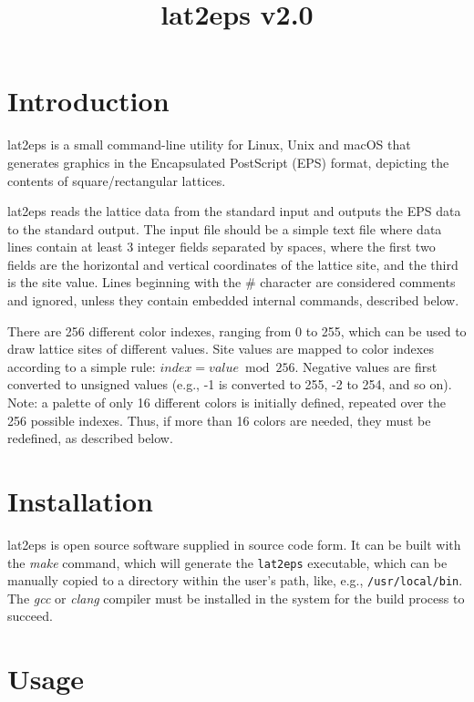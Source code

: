 \documentclass[a4paper]{article}
\title{\vspace{-5ex}lat2eps v2.0}
\author{}
\date{\vspace{-5ex}}
\begin{document}
\maketitle


\section{Introduction}

lat2eps is a small command-line utility for Linux, Unix and macOS that generates graphics in the Encapsulated PostScript (EPS) format, depicting the contents of square/rectangular lattices.
\bigbreak

lat2eps reads the lattice data from the standard input and outputs the EPS data to the standard output. The input file should be a simple text file where data lines contain at least 3 integer fields separated by spaces, where the first two fields are the horizontal and vertical coordinates of the lattice site, and the third is the site value. Lines beginning with the \# character are considered comments and ignored, unless they contain embedded internal commands, described below.
\bigbreak

There are 256 different color indexes, ranging from 0 to 255, which can be used to draw lattice sites of different values. Site values are mapped to color indexes according to a simple rule: $index = value \bmod 256$. Negative values are first converted to unsigned values (e.g., -1 is converted to 255, -2 to 254, and so on). Note: a palette of only 16 different colors is initially defined, repeated over the 256 possible indexes. Thus, if more than 16 colors are needed, they must be redefined, as described below.
\bigbreak


\section{Installation}

lat2eps is open source software supplied in source code form. It can be built with the \textit{make} command, which will generate the \texttt{lat2eps} executable, which can be manually copied to a directory within the user's path, like, e.g., \texttt{/usr/local/bin}. The \textit{gcc} or \textit{clang} compiler must be installed in the system for the build process to succeed.
\bigbreak


\section{Usage}
\end{document}
